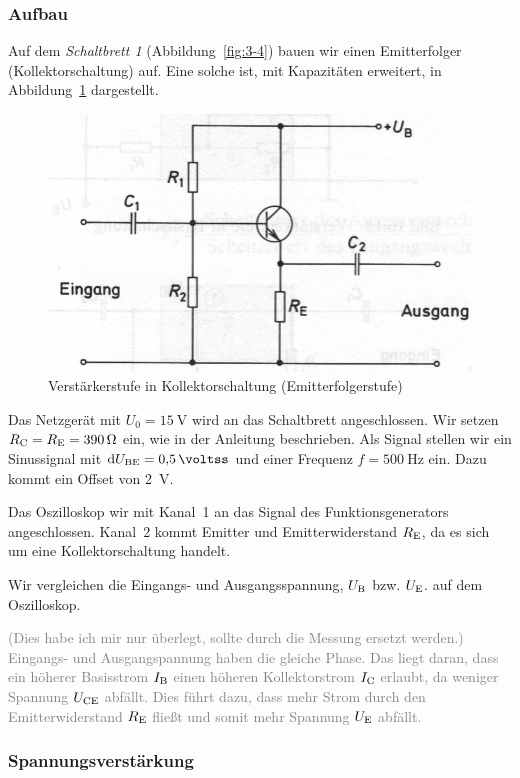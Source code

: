 \subsubsection{Aufbau}

Auf dem \emph{Schaltbrett 1} (Abbildung~\ref{fig:3-4}) bauen wir einen
Emitterfolger (Kollektorschaltung) auf. Eine solche ist, mit Kapazitäten
erweitert, in Abbildung~\ref{fig:beuth-bild-16-21} dargestellt.

\begin{figure}[htbp]
	\centering
	\includegraphics[width=.6\textwidth]{beuth-bild-16-21.jpg}
	\caption{%
		Verstärkerstufe in Kollektorschaltung (Emitterfolgerstufe)
		\cite[Bild~16.21]{beuth/elementare_elektronik}
	}
	\label{fig:beuth-bild-16-21}
\end{figure}

Das Netzgerät mit $U_0 = \SI{15}\volt$ wird an das Schaltbrett angeschlossen.
Wir setzen $R_\text{C} = R_\text{E} = \SI{390}\ohm$ ein, wie in der Anleitung beschrieben.
Als Signal stellen wir ein Sinussignal mit $\dif\UBE = \SI{.5}{\voltss}$ und
einer Frequenz $f = \SI{500}\hertz$ ein. Dazu kommt ein Offset von
\SI{2}{\volt}.

Das Oszilloskop wir mit Kanal~1 an das Signal des Funktionsgenerators
angeschlossen. Kanal~2 kommt Emitter und Emitterwiderstand $R_\text{E}$, da es sich um
eine Kollektorschaltung handelt.

Wir vergleichen die Eingangs- und Ausgangsspannung, $U_\text{B}$ bzw. $U_\text{E}$. auf dem
Oszilloskop.

\textcolor{gray}{
	(Dies habe ich mir nur überlegt, sollte durch die Messung ersetzt werden.)
	Eingangs- und Ausgangspannung haben die gleiche Phase. Das liegt daran,
	dass ein höherer Basisstrom $I_\text{B}$ einen höheren Kollektorstrom $I_\text{C}$
	erlaubt, da weniger Spannung $U_\text{CE}$ abfällt. Dies führt dazu, dass mehr
	Strom durch den Emitterwiderstand $R_\text{E}$ fließt und somit mehr Spannung
	$U_\text{E}$ abfällt.
}

\subsubsection{Spannungsverstärkung}

